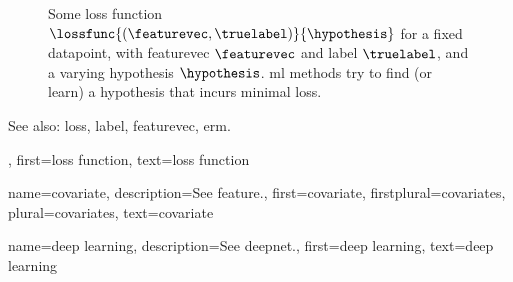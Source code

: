 {{\begin{figure}[H]
\begin{center}
\begin{tikzpicture}[scale = 0.7,%
        				every axis/.append style={
          			axis line style={-Latex, thick},
          			tick style={thick}
        				}]
				\end{tikzpicture}
			\end{center}
			\vspace*{-7mm}
		\caption{Some \gls{loss} \gls{function} $\lossfunc{(\featurevec,\truelabel)}{\hypothesis}$ for a fixed \gls{datapoint}, with 
			\gls{featurevec} $\featurevec$ and \gls{label} $\truelabel$, and a varying \gls{hypothesis} $\hypothesis$. 
			\gls{ml} methods try to find (or learn) a \gls{hypothesis} that incurs minimal \gls{loss}.}
			\label{fig_loss_function_gls_dict}
		\end{figure}
		See also: \gls{loss}, \gls{label}, \gls{featurevec}, \gls{erm}.},
 	first={loss function},
 	text={loss function} 
}

{name={covariate},
	description={See \gls{feature}.}, 
	first={covariate},
	firstplural={covariates},
	plural={covariates}, 
	text={covariate}
}

{name={deep learning},
	description={See \gls{deepnet}.},
	first={deep learning},
	text={deep learning}
}

